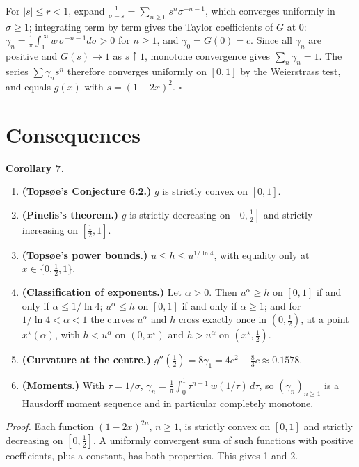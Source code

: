 \documentclass[
  11pt,
]{article}
\providecommand{\tightlist}{%
  \setlength{\itemsep}{0pt}\setlength{\parskip}{0pt}}
\begin{document}
For \(|s| \le r < 1\), expand
\(\frac{1}{\sigma - s} = \sum_{n\ge0} s^n \sigma^{-n-1}\), which
converges uniformly in \(\sigma \ge 1\); integrating term by term gives
the Taylor coefficients of \(G\) at \(0\):
\(\gamma_n = \frac1\pi\int_1^\infty w\,\sigma^{-n-1}d\sigma > 0\) for
\(n \ge 1\), and \(\gamma_0 = G(0) = c\). Since all \(\gamma_n\) are
positive and \(G(s) \to 1\) as \(s \uparrow 1\), monotone convergence
gives \(\sum_n \gamma_n = 1\). The series \(\sum\gamma_n s^n\) therefore
converges uniformly on \([0,1]\) by the Weierstrass test, and equals
\(g(x)\) with \(s = (1-2x)^2\). \(\square\)

\hypertarget{consequences}{%
\section{Consequences}\label{consequences}}

\textbf{Corollary 7.}

\begin{enumerate}
\def\labelenumi{\arabic{enumi}.}
\tightlist
\item
  \textbf{(Topsøe's Conjecture 6.2.)} \(g\) is strictly convex on
  \([0,1]\).
\item
  \textbf{(Pinelis's theorem.)} \(g\) is strictly decreasing on
  \([0,\tfrac12]\) and strictly increasing on \([\tfrac12,1]\).
\item
  \textbf{(Topsøe's power bounds.)} \(u \le h \le u^{1/\ln 4}\), with
  equality only at \(x \in \{0,\tfrac12,1\}\).
\item
  \textbf{(Classification of exponents.)} Let \(\alpha > 0\). Then
  \(u^\alpha \ge h\) on \([0,1]\) if and only if \(\alpha \le 1/\ln 4\);
  \(u^\alpha \le h\) on \([0,1]\) if and only if \(\alpha \ge 1\); and
  for \(1/\ln 4 < \alpha < 1\) the curves \(u^\alpha\) and \(h\) cross
  exactly once in \((0,\tfrac12)\), at a point \(x^\star(\alpha)\), with
  \(h < u^\alpha\) on \((0,x^\star)\) and \(h > u^\alpha\) on
  \((x^\star,\tfrac12)\).
\item
  \textbf{(Curvature at the centre.)}
  \(g''(\tfrac12) = 8\gamma_1 = 4c^2 - \tfrac83 c \approx 0.1578\).
\item
  \textbf{(Moments.)} With \(\tau = 1/\sigma\),
  \(\gamma_n = \frac1\pi\int_0^1 \tau^{n-1}\, w(1/\tau)\, d\tau\), so
  \((\gamma_n)_{n\ge1}\) is a Hausdorff moment sequence and in
  particular completely monotone.
\end{enumerate}

\emph{Proof.} Each function \((1-2x)^{2n}\), \(n \ge 1\), is strictly
convex on \([0,1]\) and strictly decreasing on \([0,\tfrac12]\). A
uniformly convergent sum of such functions with positive coefficients,
plus a constant, has both properties. This gives 1 and 2.
\end{document}
